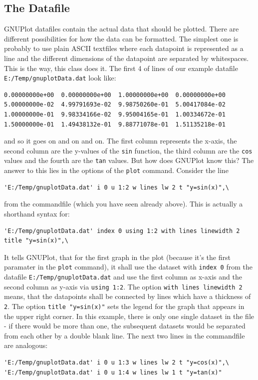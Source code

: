 \documentclass[11pt]{article}
\begin{document}
\subsection{The Datafile}
GNUPlot datafiles contain the actual data that should be plotted. There are different possibilities for how the data can be formatted. The simplest one is probably to use plain ASCII textfiles where each datapoint is represented as a line and the different dimensions of the datapoint are separated by whitespaces. This is the way, this class does it. The first 4 of lines of our example datafile \texttt{E:/Temp/gnuplotData.dat} look like:
\begin{verbatim}
0.00000000e+00  0.00000000e+00  1.00000000e+00  0.00000000e+00 
5.00000000e-02  4.99791693e-02  9.98750260e-01  5.00417084e-02 
1.00000000e-01  9.98334166e-02  9.95004165e-01  1.00334672e-01 
1.50000000e-01  1.49438132e-01  9.88771078e-01  1.51135218e-01 
\end{verbatim}
and so it goes on and on and on. The first column represents the x-axis, the second column are the y-values of the \texttt{sin} function, the third column are the \texttt{cos} values and the fourth are the \texttt{tan} values. But how does GNUPlot know this? The answer to this lies in the options of the \texttt{plot} command. Consider the line
\begin{verbatim}
'E:/Temp/gnuplotData.dat' i 0 u 1:2 w lines lw 2 t "y=sin(x)",\
\end{verbatim}
from the commandfile (which you have seen already above). This is actually a shorthand syntax for:
\begin{verbatim}
'E:/Temp/gnuplotData.dat' index 0 using 1:2 with lines linewidth 2 title "y=sin(x)",\
\end{verbatim}
It tells GNUPlot, that for the first graph in the plot (because it's the first paramater in the \texttt{plot} command), it shall use the dataset with \texttt{index 0} from the datafile \texttt{E:/Temp/gnuplotData.dat} and use the first column as x-axis and the second column as y-axis via \texttt{using 1:2}. The option \texttt{with lines linewidth 2} means, that the datapoints shall be connected by lines which have a thickness of \texttt{2}. The option \texttt{title "y=sin(x)"} sets the legend for the graph that appears in the upper right corner. In this example, there is only one single dataset in the file - if there would be more than one, the subsequent datasets would be separated from each other by a double blank line. The next two lines in the commandfile are analogous:
\begin{verbatim}
'E:/Temp/gnuplotData.dat' i 0 u 1:3 w lines lw 2 t "y=cos(x)",\
'E:/Temp/gnuplotData.dat' i 0 u 1:4 w lines lw 1 t "y=tan(x)"
\end{verbatim}
\end{document}
